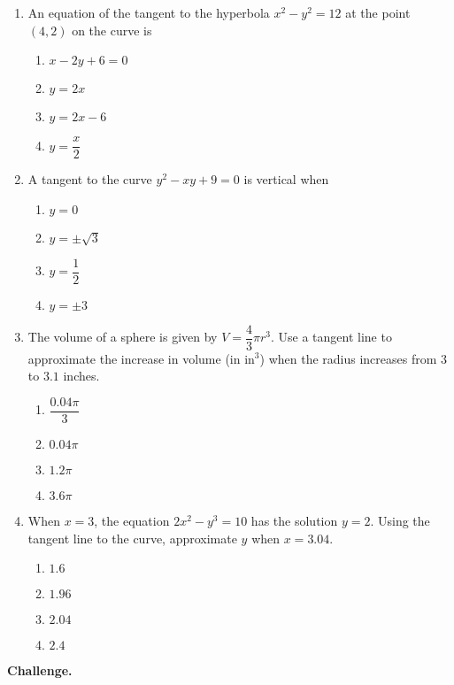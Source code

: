 \documentclass[12pt]{article}
\begin{document}
\begin{enumerate}[label=\textbf{A\arabic*.}]
\item An equation of the tangent to the hyperbola $x^{2}-y^{2}=12$ at the point $(4,2)$ on the curve is
\begin{enumerate}[label=(\Alph*)]
\item $x-2y+6=0$ \item $y=2x$ \item $y=2x-6$ \item $y=\dfrac{x}{2}$
\end{enumerate}

\item A tangent to the curve $y^{2}-xy+9=0$ is vertical when
\begin{enumerate}[label=(\Alph*)]
\item $y=0$ \item $y=\pm\sqrt{3}$ \item $y=\dfrac12$ \item $y=\pm 3$
\end{enumerate}

\item The volume of a sphere is given by $V=\dfrac{4}{3}\pi r^{3}$. Use a tangent line to approximate the increase in volume (in $\text{in}^{3}$) when the radius increases from $3$ to $3.1$ inches.
\begin{enumerate}[label=(\Alph*)]
\item $\dfrac{0.04\pi}{3}$ \item $0.04\pi$ \item $1.2\pi$ \item $3.6\pi$
\end{enumerate}

\item When $x=3$, the equation $2x^{2}-y^{3}=10$ has the solution $y=2$. Using the tangent line to the curve, approximate $y$ when $x=3.04$.
\begin{enumerate}[label=(\Alph*)]
\item $1.6$ \item $1.96$ \item $2.04$ \item $2.4$
\end{enumerate}

\end{enumerate}

\textbf{Challenge.}
\end{document}
